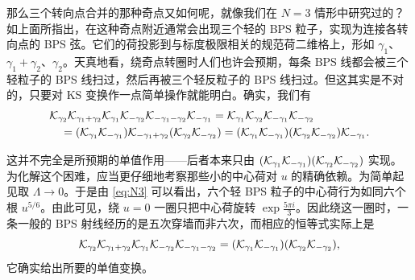 那么三个转向点合并的那种奇点又如何呢，就像我们在 $N=3$ 情形中研究过的？如上面所指出，在这种奇点附近通常会出现三个轻的 BPS 粒子，实现为连接各转向点的 BPS 弦。它们的荷投影到与标度极限相关的规范荷二维格上，形如 $\gamma_1$、$\gamma_1 + \gamma_2$、$\gamma_2$。天真地看，绕奇点转圈时人们也许会预期，每条 BPS 线都会被三个轻粒子的 BPS 线扫过，然后再被三个轻反粒子的 BPS 线扫过。但这其实是不对的，只要对 KS 变换作一点简单操作就能明白。确实，我们有
\begin{equation}\label{eq:KS-chain}
\begin{split}
&\mathcal{K}_{\gamma_2}\mathcal{K}_{\gamma_1+\gamma_2}\mathcal{K}_{\gamma_1} \mathcal{K}_{-\gamma_2}\mathcal{K}_{-\gamma_1-\gamma_2}\mathcal{K}_{-\gamma_1}
= \mathcal{K}_{\gamma_1}\mathcal{K}_{\gamma_2} \mathcal{K}_{-\gamma_1}\mathcal{K}_{-\gamma_2} \\
&\quad = (\mathcal{K}_{\gamma_1} \mathcal{K}_{-\gamma_1})\mathcal{K}_{-\gamma_1+\gamma_2}(\mathcal{K}_{\gamma_2}\mathcal{K}_{-\gamma_2})
= (\mathcal{K}_{\gamma_1} \mathcal{K}_{-\gamma_1})(\mathcal{K}_{\gamma_2}\mathcal{K}_{-\gamma_2})\mathcal{K}_{-\gamma_1}.
\end{split}
\end{equation}

这并不完全是所预期的单值作用——后者本来只由 $(\mathcal{K}_{\gamma_1} \mathcal{K}_{-\gamma_1})(\mathcal{K}_{\gamma_2}\mathcal{K}_{-\gamma_2})$ 实现。为化解这个困难，应当更仔细地考察那些小的中心荷对 $u$ 的精确依赖。为简单起见取 $\Lambda \to 0$。于是由 \eqref{eq:N3} 可以看出，六个轻 BPS 粒子的中心荷行为如同六个根 $u^{5/6}$。由此可见，绕 $u=0$ 一圈只把中心荷旋转 $\exp \frac{5\pi i}{3}$。因此绕这一圈时，一条一般的 BPS 射线经历的是五次穿墙而非六次，而相应的恒等式实际上是
\begin{equation}
\mathcal{K}_{\gamma_2}\mathcal{K}_{\gamma_1+\gamma_2}\mathcal{K}_{\gamma_1} \mathcal{K}_{-\gamma_2}\mathcal{K}_{-\gamma_1-\gamma_2}
= (\mathcal{K}_{\gamma_1} \mathcal{K}_{-\gamma_1})(\mathcal{K}_{\gamma_2}\mathcal{K}_{-\gamma_2}), \label{eq:KS-chain-final}
\end{equation}
它确实给出所要的单值变换。
